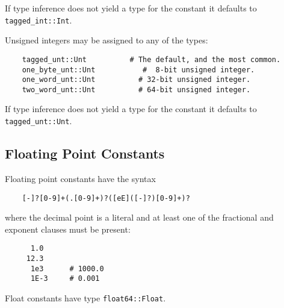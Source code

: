 If type inference does not yield a type for the constant 
it defaults to {\tt tagged\_int::Int}.

Unsigned integers may be assigned to any of the types:
\begin{verbatim}
    tagged_unt::Unt          # The default, and the most common.
    one_byte_unt::Unt           #  8-bit unsigned integer.
    one_word_unt::Unt          # 32-bit unsigned integer.
    two_word_unt::Unt          # 64-bit unsigned integer.
\end{verbatim}

If type inference does not yield a type for the constant 
it defaults to {\tt tagged\_unt::Unt}.

\cutend*


\subsection{Floating Point Constants}
\label{section:ref:constants:float}

Floating point constants have the syntax
\begin{verbatim}
    [-]?[0-9]+(.[0-9]+)?([eE]([-]?)[0-9]+)?
\end{verbatim}
where the decimal point is a literal and at least one of 
the fractional and exponent clauses must be present:
\begin{verbatim}
      1.0
     12.3
      1e3      # 1000.0
      1E-3     # 0.001
\end{verbatim}

Float constants have type {\tt float64::Float}.

\cutend*
